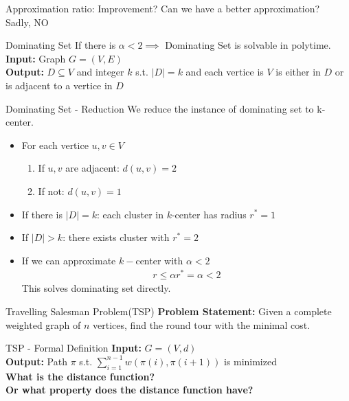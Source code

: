 \documentclass{beamer}
\newcommand*{\brk}{\\[10pt]}
\begin{document}
\begin{frame}{Approximation ratio: Improvement?}
    Can we have a better approximation? \brk
    Sadly, NO
\end{frame}


\begin{frame}{Dominating Set}
    If there is $\alpha < 2 \implies$ Dominating Set is solvable in polytime. \brk 
    \textbf{Input:} Graph $G = (V, E)$ \brk
    \textbf{Output:} $D \subseteq V$ and integer $k$ s.t. $|D| = k$ and each vertice is $V$ is either in $D$ or is adjacent to a vertice in $D$
\end{frame}

\begin{frame}{Dominating Set - Reduction}
    We reduce the instance of dominating set to k-center. 
    \begin{itemize}
        \item For each vertice $u, v \in V$ 
        \begin{enumerate}
            \item If $u, v$ are adjacent: $d(u, v) = 2$
            \item If not: $d(u, v) = 1$
        \end{enumerate}
        \item If there is $|D| = k$: each cluster in $k$-center has radius $r^* = 1$
        \item If $|D| > k$: there exists cluster with $r^* = 2$
        \item If we can approximate $k-$center with $\alpha < 2$
        \begin{align*}
            r \leq \alpha r^* = \alpha < 2
        \end{align*}
        This solves dominating set directly.
    \end{itemize}
\end{frame}


\begin{frame}{Travelling Salesman Problem(TSP)}
    \textbf{Problem Statement:} Given a complete weighted graph of $n$ vertices, find the round tour with the minimal cost. 
\end{frame}

\begin{frame}{TSP - Formal Definition}
    \textbf{Input:} $G = (V, d)$ \\
    \textbf{Output:} Path $\pi$ s.t. $\sum_{i = 1}^{n-1} w(\pi(i), \pi(i+1))$
    is minimized \\[20pt]
    \pause 
    \textbf{What is the distance function? \\ Or what property does the distance function have?}
\end{frame}
\end{document}
